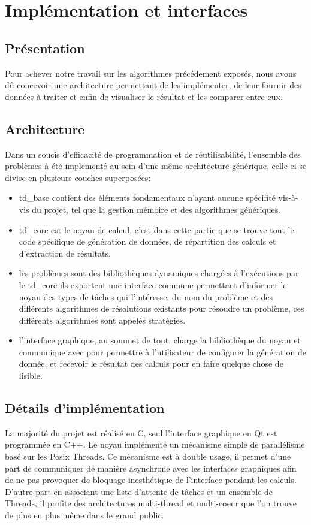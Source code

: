 \chapter{Implémentation et interfaces}
\section{Présentation}
Pour achever notre travail sur les algorithmes précédement exposés, nous avons
dû concevoir une architecture permettant de les implémenter, de leur fournir des
données à traiter et enfin de visualiser le résultat et les comparer entre eux.
\section{Architecture}
Dans un soucis d'efficacité de programmation et de réutilisabilité, l'ensemble
des problèmes à été implementé au sein d'une même architecture générique, celle-ci
se divise en plusieurs couches superposées:
\begin{itemize}
   \item td\_base contient des éléments fondamentaux n'ayant aucune spécifité
   vis-à-vis du projet, tel que la gestion mémoire et des algorithmes génériques.
   \item td\_core est le noyau de calcul, c'est dans cette partie que se trouve
   tout le code spécifique de génération de données, de répartition des calculs
   et d'extraction de résultats.
   \item les problèmes sont des bibliothèques dynamiques chargées à l'exécutions
   par le td\_core ils exportent une interface commune permettant d'informer le
   noyau des types de tâches qui l'intéresse, du nom du problème et des
   différents algorithmes de résolutions existants pour résoudre un problème,
   ces différents algorithmes sont appelés stratégies.
   \item l'interface graphique, au sommet de tout, charge la bibliothèque du 
   noyau et communique avec pour permettre à l'utilisateur de configurer la
   génération de donnée, et recevoir le résultat des calculs pour en faire
   quelque chose de lisible.
\end{itemize}
\section{Détails d'implémentation}
La majorité du projet est réalisé en C, seul l'interface graphique en Qt est programmée en C++. Le noyau implémente un mécanisme simple de parallélisme basé sur les Posix Threads.
Ce mécanisme est à double usage, il permet d'une part de communiquer de manière
asynchrone avec les interfaces graphiques afin de ne pas provoquer de bloquage
inesthétique de l'interface pendant les calculs. D'autre part en associant une
liste d'attente de tâches et un ensemble de Threads, il profite des architectures
multi-thread et multi-coeur que l'on trouve de plus en plus même dans le grand
public.

